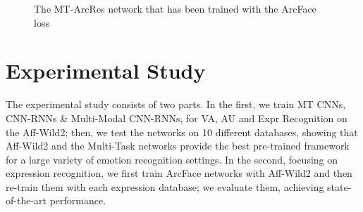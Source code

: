 \documentclass{bmvc2k}
\begin{document}
\begin{figure}[h]
\centering
{}
\caption{The MT-ArcRes network that has been trained with the ArcFace loss}
\label{ArcResnet}
\end{figure}







































\begin{comment}
\begin{figure}[h]
\scalebox{0.95}{
\begin{tabular}{ccc}
  \texttt{[image: images/happy.png]} &   \texttt{[image: images/surprise.png]} &
 \texttt{[image: images/disgust.png]} \\   \texttt{[image: images/fear.png]} &
   \texttt{[image: images/sadness.png]} &   \texttt{[image: images/angry.png]} \\
\end{tabular}
}
\caption{Distributions of six basic expressions in the VA-Space}
\label{fig:basi_expr_dist_va}
\end{figure}
\end{comment}














\section{Experimental Study}
 \vskip-0.2cm
\noindent The experimental study consists of two parts. In the first, we train MT CNNs, CNN-RNNs \& Multi-Modal CNN-RNNs, for VA, AU and Expr Recognition on the Aff-Wild2; then, we test the networks on 10 different databases, showing that Aff-Wild2 and the Multi-Task networks provide the best pre-trained framework for a large variety of emotion recognition settings. In the second, focusing on expression recognition, we first train ArcFace networks with Aff-Wild2 and then re-train them with each expression database; we evaluate them, achieving state-of-the-art performance.
\end{document}

